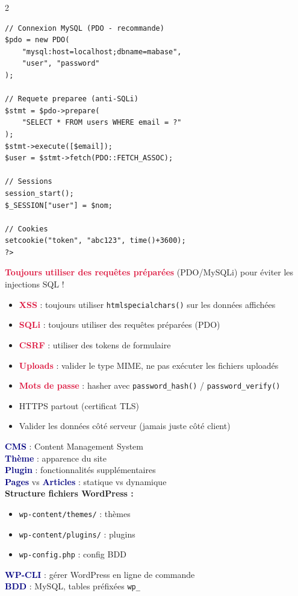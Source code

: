 \documentclass[a4paper,10pt]{article}
\newcommand{\key}[1]{\textbf{\textcolor{navy}{#1}}}
\newcommand{\warn}[1]{\textbf{\textcolor{crimson}{#1}}}
\begin{document}
\begin{multicols}{2}
\begin{tcolorbox}[basebox, colframe=green, title=8. PHP — Formulaires et BDD]
\begin{lstlisting}[style=php]
// Connexion MySQL (PDO - recommande)
$pdo = new PDO(
    "mysql:host=localhost;dbname=mabase",
    "user", "password"
);

// Requete preparee (anti-SQLi)
$stmt = $pdo->prepare(
    "SELECT * FROM users WHERE email = ?"
);
$stmt->execute([$email]);
$user = $stmt->fetch(PDO::FETCH_ASSOC);

// Sessions
session_start();
$_SESSION["user"] = $nom;

// Cookies
setcookie("token", "abc123", time()+3600);
?>
\end{lstlisting}
\warn{Toujours utiliser des requêtes préparées} (PDO/MySQLi) pour éviter les injections SQL !
\end{tcolorbox}

\begin{tcolorbox}[basebox, colframe=crimson, title=9. Sécurité Web — À ne jamais oublier]
\begin{itemize}
  \item \warn{XSS} : toujours utiliser \texttt{htmlspecialchars()} sur les données affichées
  \item \warn{SQLi} : toujours utiliser des requêtes préparées (PDO)
  \item \warn{CSRF} : utiliser des tokens de formulaire
  \item \warn{Uploads} : valider le type MIME, ne pas exécuter les fichiers uploadés
  \item \warn{Mots de passe} : hasher avec \texttt{password\_hash()} / \texttt{password\_verify()}
  \item HTTPS partout (certificat TLS)
  \item Valider les données côté serveur (jamais juste côté client)
\end{itemize}
\end{tcolorbox}

\begin{tcolorbox}[basebox, colframe=purple, title=10. WordPress — Points clés]
\key{CMS} : Content Management System \\
\key{Thème} : apparence du site \\
\key{Plugin} : fonctionnalités supplémentaires \\
\key{Pages} vs \key{Articles} : statique vs dynamique \\[4pt]
\textbf{Structure fichiers WordPress :}
\begin{itemize}
  \item \texttt{wp-content/themes/} : thèmes
  \item \texttt{wp-content/plugins/} : plugins
  \item \texttt{wp-config.php} : config BDD
\end{itemize}
\vspace{4pt}
\key{WP-CLI} : gérer WordPress en ligne de commande \\
\key{BDD} : MySQL, tables préfixées \texttt{wp\_}
\end{tcolorbox}


\end{multicols}
\end{document}
